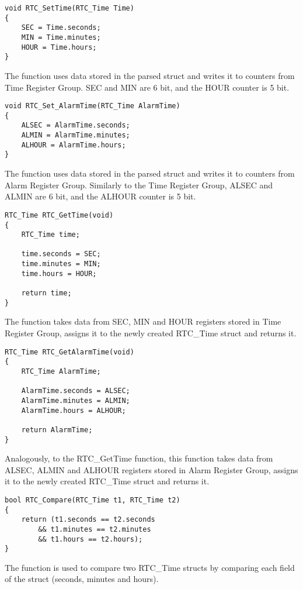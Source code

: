 \documentclass[11pt]{article}
\begin{document}
	\begin{lstlisting}[caption = {Setting time in the register function}]
void RTC_SetTime(RTC_Time Time)
{
	SEC = Time.seconds;
	MIN = Time.minutes;
	HOUR = Time.hours;
}
	\end{lstlisting}
	The function uses data stored in the parsed struct and writes it to counters from Time Register Group. SEC and MIN are 6 bit, and the HOUR counter is 5 bit.

	\begin{lstlisting}[caption = {Setting alarm time in the register function}]
void RTC_Set_AlarmTime(RTC_Time AlarmTime)
{
	ALSEC = AlarmTime.seconds;
	ALMIN = AlarmTime.minutes;
	ALHOUR = AlarmTime.hours;
}
	\end{lstlisting}
	The function uses data stored in the parsed struct and writes it to counters from Alarm Register Group. Similarly to the Time Register Group, ALSEC and ALMIN are 6 bit, and the ALHOUR counter is 5 bit.

	\begin{lstlisting}[caption = {Getting time from the register function}]
RTC_Time RTC_GetTime(void)
{
	RTC_Time time;

	time.seconds = SEC;
	time.minutes = MIN;
	time.hours = HOUR;

	return time;
}
	\end{lstlisting}
	The function takes data from SEC, MIN and HOUR registers stored in Time Register Group, assigns it to the newly created RTC\_Time struct and returns it.

	\begin{lstlisting}[caption = {Getting alarm time from the register function}]
RTC_Time RTC_GetAlarmTime(void)
{
	RTC_Time AlarmTime;

	AlarmTime.seconds = ALSEC;
	AlarmTime.minutes = ALMIN;
	AlarmTime.hours = ALHOUR;

	return AlarmTime;
}
	\end{lstlisting}
	Analogously, to the RTC\_GetTime function, this function takes data from ALSEC, ALMIN and ALHOUR registers stored in Alarm Register Group, assigns it to the newly created RTC\_Time struct and returns it.

	\begin{lstlisting}[caption = {RTC\_Time struct comparator function}]
bool RTC_Compare(RTC_Time t1, RTC_Time t2)
{
	return (t1.seconds == t2.seconds
		&& t1.minutes == t2.minutes
		&& t1.hours == t2.hours);
}
	\end{lstlisting}
	The function is used to compare two RTC\_Time structs by comparing each field of the struct (seconds, minutes and hours).
\end{document}
